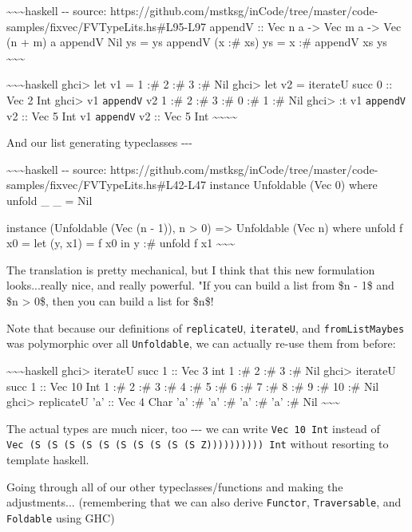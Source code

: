 \documentclass[]{article}
\begin{document}
\textasciitilde{}\textasciitilde{}\textasciitilde{}haskell -\/- source:
https://github.com/mstksg/inCode/tree/master/code-samples/fixvec/FVTypeLits.hs\#L95-L97
appendV :: Vec n a -\textgreater{} Vec m a -\textgreater{} Vec (n + m) a appendV
Nil ys = ys appendV (x :\# xs) ys = x :\# appendV xs ys
\textasciitilde{}\textasciitilde{}\textasciitilde{}

\textasciitilde{}\textasciitilde{}\textasciitilde{}haskell ghci\textgreater{}
let v1 = 1 :\# 2 :\# 3 :\# Nil ghci\textgreater{} let v2 = iterateU succ 0 ::
Vec 2 Int ghci\textgreater{} v1 \texttt{appendV} v2 1 :\# 2 :\# 3 :\# 0 :\# 1
:\# Nil ghci\textgreater{} :t v1 \texttt{appendV} v2 :: Vec 5 Int v1
\texttt{appendV} v2 :: Vec 5 Int
\textasciitilde{}\textasciitilde{}\textasciitilde{}\textasciitilde{}

And our list generating typeclasses -\/-\/-

\textasciitilde{}\textasciitilde{}\textasciitilde{}haskell -\/- source:
https://github.com/mstksg/inCode/tree/master/code-samples/fixvec/FVTypeLits.hs\#L42-L47
instance Unfoldable (Vec 0) where unfold \_ \_ = Nil

instance (Unfoldable (Vec (n - 1)), n \textgreater{} 0) =\textgreater{}
Unfoldable (Vec n) where unfold f x0 = let (y, x1) = f x0 in y :\# unfold f x1
\textasciitilde{}\textasciitilde{}\textasciitilde{}

The translation is pretty mechanical, but I think that this new formulation
looks...really nice, and really powerful. "If you can build a list from \$n -
1\$ and \$n \textgreater{} 0\$, then you can build a list for \$n\$!

Note that because our definitions of \texttt{replicateU}, \texttt{iterateU}, and
\texttt{fromListMaybes} was polymorphic over all \texttt{Unfoldable}, we can
actually re-use them from before:

\textasciitilde{}\textasciitilde{}\textasciitilde{}haskell ghci\textgreater{}
iterateU succ 1 :: Vec 3 int 1 :\# 2 :\# 3 :\# Nil ghci\textgreater{} iterateU
succ 1 :: Vec 10 Int 1 :\# 2 :\# 3 :\# 4 :\# 5 :\# 6 :\# 7 :\# 8 :\# 9 :\# 10
:\# Nil ghci\textgreater{} replicateU 'a' :: Vec 4 Char 'a' :\# 'a' :\# 'a' :\#
'a' :\# Nil \textasciitilde{}\textasciitilde{}\textasciitilde{}

The actual types are much nicer, too -\/-\/- we can write \texttt{Vec\ 10\ Int}
instead of
\texttt{Vec\ (S\ (S\ (S\ (S\ (S\ (S\ (S\ (S\ (S\ (S\ Z))))))))))\ Int} without
resorting to template haskell.

Going through all of our other typeclasses/functions and making the
adjustments... (remembering that we can also derive \texttt{Functor},
\texttt{Traversable}, and \texttt{Foldable} using GHC)
\end{document}
